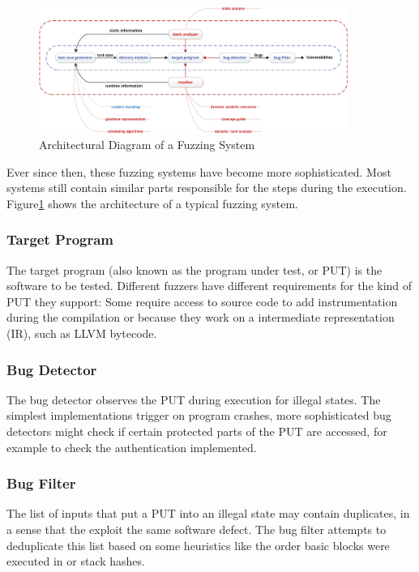 \documentclass{article}
\begin{document}
\begin{multicols}{2}
    \begin{figure}[!tp]
        \centering
        \includegraphics[width=0.9\textwidth]{assets/FuzzingSteps.jpg}
        \caption{Architectural Diagram of a Fuzzing System\cite{Science}}
        \label{fig:FuzzingSteps}
    \end{figure}

    Ever since then, these fuzzing systems have become more sophisticated. Most systems still contain similar parts responsible for the steps during the execution. Figure\ref{fig:FuzzingSteps} shows the architecture of a typical fuzzing system.

    \subsubsection{Target Program}
    The target program (also known as the program under test, or PUT) is the software to be tested. Different fuzzers have different requirements for the kind of PUT they support: Some require access to source code to add instrumentation during the compilation or because they work on a intermediate representation (IR), such as LLVM bytecode.

    \subsubsection{Bug Detector}
    The bug detector observes the PUT during execution for illegal states. The simplest implementations trigger on program crashes, more sophisticated bug detectors might check if certain protected parts of the PUT are accessed, for example to check the authentication implemented.

    \subsubsection{Bug Filter}
    The list of inputs that put a PUT into an illegal state may contain duplicates, in a sense that the exploit the same software defect. The bug filter attempts to deduplicate this list based on some heuristics like the order basic blocks were executed in or stack hashes.


\end{multicols}
\end{document}
